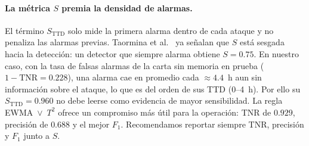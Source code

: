 \documentclass[11pt,a4paper]{article}
\begin{document}
\paragraph{La métrica $S$ premia la densidad de alarmas.} El término
$S_{\mathrm{TTD}}$ solo mide la primera alarma dentro de cada ataque y no penaliza las
alarmas previas. Taormina et al.~\cite{taormina2018} ya señalan que $S$ está sesgada
hacia la detección: un detector que siempre alarma obtiene $S=0.75$. En nuestro caso,
con la tasa de falsas alarmas de la carta sin memoria en prueba
($1-\mathrm{TNR}=0.228$), una alarma cae en promedio cada $\approx4.4$~h aun sin
información sobre el ataque, lo que es del orden de sus TTD (0--4~h). Por ello su
$S_{\mathrm{TTD}}=0.960$ no debe leerse como evidencia de mayor sensibilidad. La regla
EWMA~$\vee$~$T^2$ ofrece un compromiso más útil para la operación: TNR de $0.929$,
precisión de $0.688$ y el mejor $F_1$. Recomendamos reportar siempre TNR, precisión y
$F_1$ junto a $S$.
\end{document}
